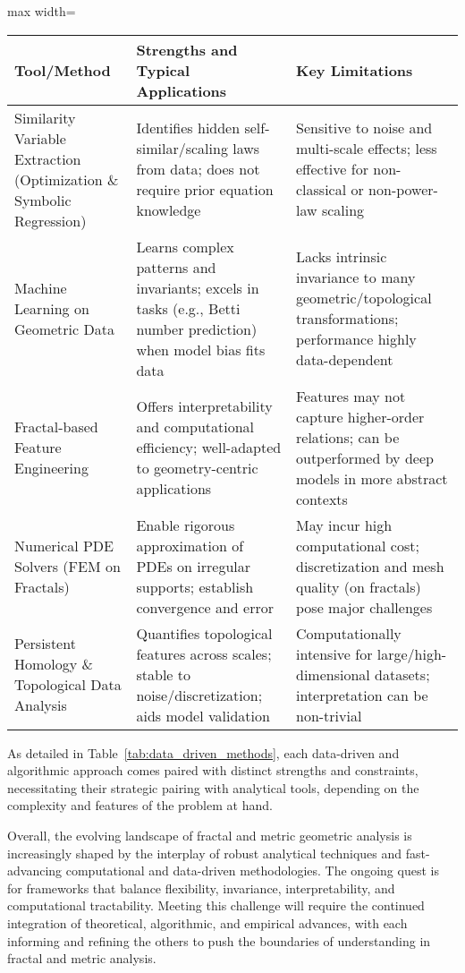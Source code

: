 \begin{table*}[htbp]
\centering
\caption{Comparative Summary of Data-driven and Algorithmic Approaches}
\label{tab:data_driven_methods}
\begin{adjustbox}{max width=\textwidth}
\begin{tabular}{lll}
\toprule
\textbf{Tool/Method} & \textbf{Strengths and Typical Applications} & \textbf{Key Limitations} \\
\midrule
Similarity Variable Extraction (Optimization \& Symbolic Regression) & Identifies hidden self-similar/scaling laws from data; does not require prior equation knowledge & Sensitive to noise and multi-scale effects; less effective for non-classical or non-power-law scaling \\
Machine Learning on Geometric Data & Learns complex patterns and invariants; excels in tasks (e.g., Betti number prediction) when model bias fits data & Lacks intrinsic invariance to many geometric/topological transformations; performance highly data-dependent \\
Fractal-based Feature Engineering & Offers interpretability and computational efficiency; well-adapted to geometry-centric applications & Features may not capture higher-order relations; can be outperformed by deep models in more abstract contexts \\
Numerical PDE Solvers (FEM on Fractals) & Enable rigorous approximation of PDEs on irregular supports; establish convergence and error & May incur high computational cost; discretization and mesh quality (on fractals) pose major challenges \\
Persistent Homology \& Topological Data Analysis & Quantifies topological features across scales; stable to noise/discretization; aids model validation & Computationally intensive for large/high-dimensional datasets; interpretation can be non-trivial \\
\bottomrule
\end{tabular}
\end{adjustbox}
\end{table*}

As detailed in Table~\ref{tab:data_driven_methods}, each data-driven and algorithmic approach comes paired with distinct strengths and constraints, necessitating their strategic pairing with analytical tools, depending on the complexity and features of the problem at hand.

Overall, the evolving landscape of fractal and metric geometric analysis is increasingly shaped by the interplay of robust analytical techniques and fast-advancing computational and data-driven methodologies. The ongoing quest is for frameworks that balance flexibility, invariance, interpretability, and computational tractability. Meeting this challenge will require the continued integration of theoretical, algorithmic, and empirical advances, with each informing and refining the others to push the boundaries of understanding in fractal and metric analysis.

